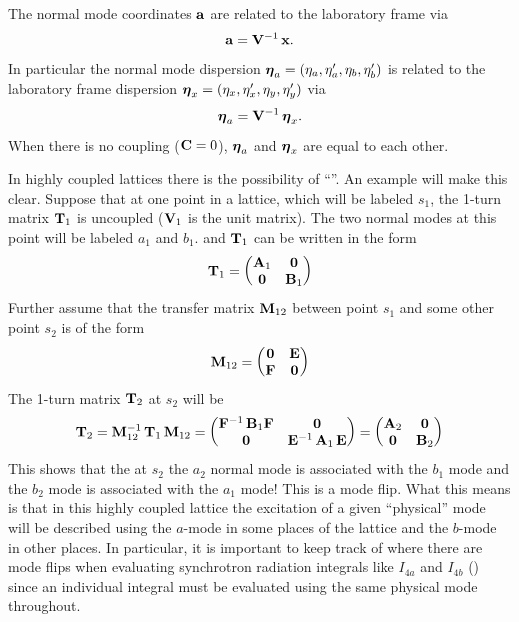 The normal mode coordinates ${\bf a}$ are related to the laboratory frame via
  \begin{equation}
    {\bf a} = {\bf V}^{-1} \, {\bf x}
    . \label{avx}
  \end{equation} 
In particular the normal mode dispersion $\boldsymbol{\eta}_a = (\eta_a, \eta'_a, \eta_b, \eta'_b)$ is related
to the laboratory frame dispersion $\boldsymbol{\eta}_x = (\eta_x, \eta'_x, \eta_y, \eta'_y)$ via
  \begin{equation}
    {\boldsymbol{\eta}_a} = {\bf V}^{-1} \, {\boldsymbol{\eta}_x}
    . \label{etaavx}
  \end{equation} 
When there is no coupling (${\bf C} = 0$), $\boldsymbol{\eta}_a$ and $\boldsymbol{\eta}_x$ are
equal to each other.

In highly coupled lattices there is the possibility of ``''. An example will make
this clear. Suppose that at one point in a lattice, which will be labeled $s_1$, the 1-turn matrix
${\bf T}_1$ is uncoupled (${\bf V}_1$ is the unit matrix). The two normal modes at this point will be
labeled $a_1$ and $b_1$. and ${\bf T}_1$ can be written in the form
\begin{equation}
  {\bf T}_1 = 
    \begin{pmatrix}
      {\bf A}_1 & {\bf 0} \cr 
      {\bf 0}   & {\bf B}_1 \cr
    \end{pmatrix}
\end{equation}
Further assume that the transfer matrix ${\bf M}_{12}$ between point $s_1$ and some other point $s_2$
is of the form
\begin{equation}
  {\bf M}_{12} = 
    \begin{pmatrix}
      {\bf 0} & {\bf E} \cr 
      {\bf F} & {\bf 0} \cr
    \end{pmatrix}
    \label{t0ef0}
\end{equation}
The 1-turn matrix ${\bf T}_2$ at $s_2$ will be
\begin{equation}
  {\bf T}_2 = {\bf M}_{12}^{-1} \, {\bf T}_1 \, {\bf M}_{12}
  = \begin{pmatrix}
      {\bf F}^{-1} \, {\bf B}_1 {\bf F} & {\bf 0} \cr 
      {\bf 0}                     & {\bf E}^{-1} \, {\bf A}_1 \, {\bf E} \cr
    \end{pmatrix}
  = \begin{pmatrix}
      {\bf A}_2 & {\bf 0} \cr 
      {\bf 0}   & {\bf B}_2 \cr
    \end{pmatrix}
\end{equation}
This shows that the at $s_2$ the $a_2$ normal mode is associated with the $b_1$ mode and the $b_2$
mode is associated with the $a_1$ mode! This is a mode flip. What this means is that in this highly
coupled lattice the excitation of a given ``physical'' mode will be described using the $a$-mode in
some places of the lattice and the $b$-mode in other places. In particular, it is important to keep
track of where there are mode flips when evaluating synchrotron radiation integrals
like $I_{4a}$ and $I_{4b}$ () since an individual integral must be evaluated
using the same physical mode throughout.

